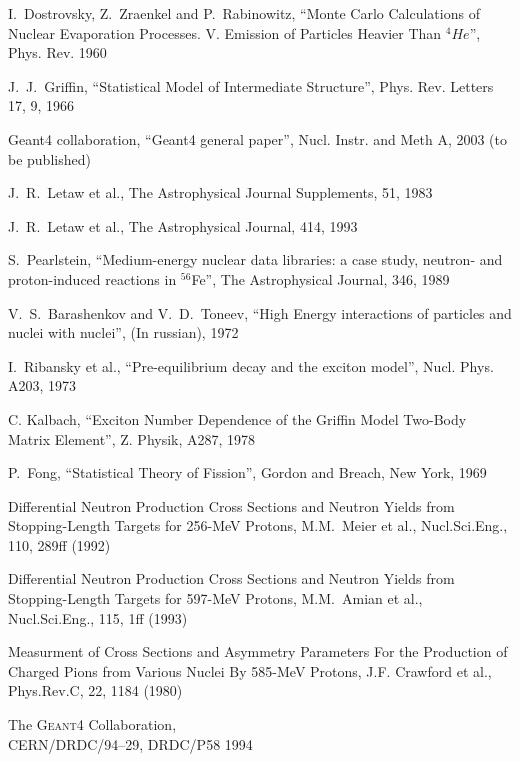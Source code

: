 \documentclass[twocolumn,twoside,slac,floatfix]{revtex4}
\begin{document}
\begin{thebibliography}{9}
I.~Dostrovsky, Z.~Zraenkel and P.~Rabinowitz,
``Monte Carlo Calculations of Nuclear Evaporation Processes. V. Emission of Particles Heavier Than $^4\!He$'',
Phys. Rev. 1960


J.~J.~Griffin,
``Statistical Model of Intermediate Structure'',
Phys. Rev. Letters 17, 9, 1966

Geant4 collaboration,
``Geant4 general paper'',
Nucl. Instr. and Meth A, 2003 (to be published)

J.~R.~Letaw et al.,
The Astrophysical Journal Supplements, 51, 1983


J.~R.~Letaw et al.,
The Astrophysical Journal, 414, 1993


S.~Pearlstein,
``Medium-energy nuclear data libraries: a case study, neutron- and proton-induced reactions in $^{56}${F}e'',
The Astrophysical Journal, 346, 1989

V.~S.~Barashenkov and V.~D.~Toneev,
``High Energy interactions of particles and nuclei with nuclei'',
(In russian), 1972

I.~Ribansky et al.,
``Pre-equilibrium decay and the exciton model'',
Nucl. Phys. A203, 1973

C. Kalbach,
``Exciton Number Dependence of the Griffin Model Two-Body Matrix Element'',
Z. Physik, A287, 1978


P.~Fong,
``Statistical Theory of Fission'',
Gordon and Breach, New York, 1969

Differential Neutron Production Cross Sections and
            Neutron Yields from Stopping-Length Targets for
            256-MeV Protons, M.M.~Meier et al., Nucl.Sci.Eng., 110, 289ff (1992)

Differential Neutron Production Cross Sections and
            Neutron Yields from Stopping-Length Targets for
            597-MeV Protons, M.M.~Amian et al., Nucl.Sci.Eng., 115, 1ff (1993)

Measurment of Cross Sections and Asymmetry Parameters
           For the Production of Charged Pions from Various Nuclei
           By 585-MeV Protons, J.F. Crawford et al., Phys.Rev.C, 22, 1184 (1980)

 The {\scshape Geant4} Collaboration, \\
CERN/DRDC/94--29, DRDC/P58 1994


\end{thebibliography}
\end{document}
